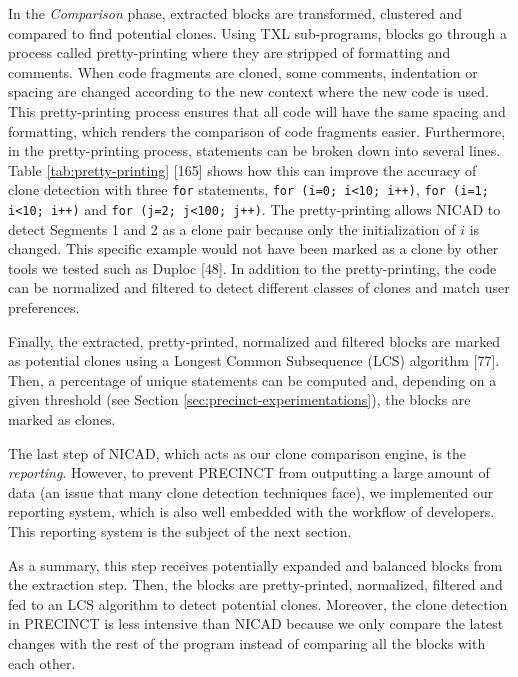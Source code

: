 \documentclass[12pt]{report}
\begin{document}
In the \emph{Comparison} phase, extracted blocks are transformed,
clustered and compared to find potential clones. Using TXL sub-programs,
blocks go through a process called pretty-printing where they are
stripped of formatting and comments. When code fragments are cloned,
some comments, indentation or spacing are changed according to the new
context where the new code is used. This pretty-printing process ensures
that all code will have the same spacing and formatting, which renders
the comparison of code fragments easier. Furthermore, in the
pretty-printing process, statements can be broken down into several
lines. Table \ref{tab:pretty-printing} {[}165{]} shows how this can
improve the accuracy of clone detection with three \lstinline!for!
statements, \lstinline!for (i=0; i<10; i++)!,
\lstinline!for (i=1; i<10; i++)! and \lstinline!for (j=2; j<100; j++)!.
The pretty-printing allows NICAD to detect Segments 1 and 2 as a clone
pair because only the initialization of \(i\) is changed. This specific
example would not have been marked as a clone by other tools we tested
such as Duploc {[}48{]}. In addition to the pretty-printing, the code
can be normalized and filtered to detect different classes of clones and
match user preferences.



Finally, the extracted, pretty-printed, normalized and filtered blocks
are marked as potential clones using a Longest Common Subsequence (LCS)
algorithm {[}77{]}. Then, a percentage of unique statements can be
computed and, depending on a given threshold (see Section
\ref{sec:precinct-experimentations}), the blocks are marked as clones.

The last step of NICAD, which acts as our clone comparison engine, is
the \emph{reporting}. However, to prevent PRECINCT from outputting a
large amount of data (an issue that many clone detection techniques
face), we implemented our reporting system, which is also well embedded
with the workflow of developers. This reporting system is the subject of
the next section.

As a summary, this step receives potentially expanded and balanced
blocks from the extraction step. Then, the blocks are pretty-printed,
normalized, filtered and fed to an LCS algorithm to detect potential
clones. Moreover, the clone detection in PRECINCT is less intensive than
NICAD because we only compare the latest changes with the rest of the
program instead of comparing all the blocks with each other.
\end{document}
